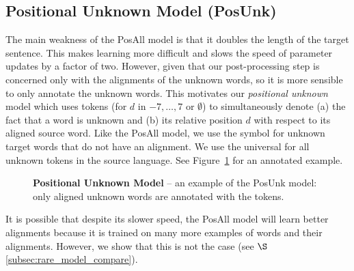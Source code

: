 \subsection{Positional Unknown Model (PosUnk)}

The main weakness of the PosAll model is that it doubles the length of the target sentence. This
makes learning more difficult and slows the speed of parameter updates by a factor of two.
However, given that our post-processing step is concerned only with the alignments of the unknown words,
so it is more sensible to only annotate the unknown words. 
This motivates our {\it positional unknown} model which uses  
tokens (for $d$ in $-7,\ldots,7$ or $\emptyset$) to simultaneously 
denote (a) the fact that a word is unknown and (b) its relative position $d$ with respect to its aligned source word. 
Like the PosAll model, we use the symbol \unkpos{\emptyset} for unknown target words that do not have an alignment. 
We use the universal \unksym{} for all unknown tokens in the source language. See Figure~\ref{f:pos_unk} for an annotated example.

\begin{figure}[tbh!]
\caption[Positional Unknown Model]{ {\bf Positional Unknown Model} -- 
an example of the PosUnk model: only aligned unknown words are annotated with the  tokens.}
\label{f:pos_unk}
\end{figure}

It is possible that despite its slower speed, the PosAll model will learn better alignments because 
it is trained on many more examples of words and their alignments. 
However, we show that this is not the case (see $\S$\ref{subsec:rare_model_compare}).


